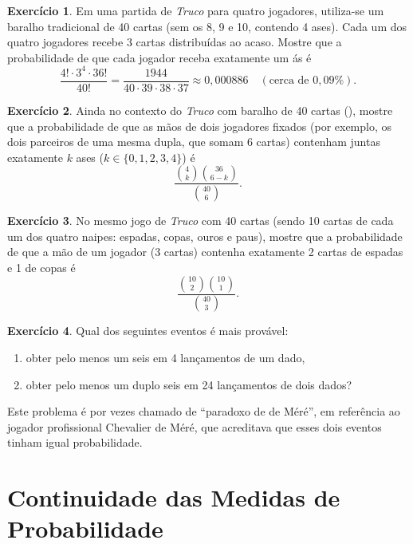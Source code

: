 \documentclass[12pt,portuguese]{article}
\theoremstyle{definition}
\newtheorem{exercise}{Exercício}
\begin{document}
\begin{exercise}\label{exercise:1.27}
Em uma partida de \emph{Truco} para quatro jogadores, utiliza-se um baralho
tradicional de 40 cartas (sem os 8, 9 e 10, contendo 4 ases). Cada um dos
quatro jogadores recebe 3 cartas distribuídas ao acaso. Mostre que a
probabilidade de que cada jogador receba exatamente um ás é
\[
\frac{4! \cdot 3^4 \cdot 36!}{40!}
= \frac{1944}{40 \cdot 39 \cdot 38 \cdot 37}
\approx 0{,}000886 \quad (\text{cerca de } 0{,}09\%).
\]
\end{exercise}

\begin{exercise}\label{exercise:1.28}
Ainda no contexto do \emph{Truco} com baralho de 40 cartas (),
mostre que a probabilidade de que as mãos de dois jogadores fixados (por exemplo,
os dois parceiros de uma mesma dupla, que somam 6 cartas) contenham juntas
exatamente \(k\) ases (\(k \in \{0, 1, 2, 3, 4\}\)) é
\[
\frac{\binom{4}{k} \binom{36}{6-k}}{\binom{40}{6}}.
\]
\end{exercise}

\begin{exercise}\label{exercise:1.29}
No mesmo jogo de \emph{Truco} com 40 cartas (sendo 10 cartas de cada um dos
quatro naipes: espadas, copas, ouros e paus), mostre que a probabilidade de
que a mão de um jogador (3 cartas) contenha exatamente 2 cartas de espadas e
1 de copas é
\[
\frac{\binom{10}{2} \binom{10}{1}}{\binom{40}{3}}.
\]
\end{exercise}

\begin{exercise}\label{exercise:1.30}
Qual dos seguintes eventos é mais provável:
\begin{enumerate}[label=(\alph*), ref=\alph*]
\item obter pelo menos um seis em 4 lançamentos de um dado,
\item obter pelo menos um duplo seis em 24 lançamentos de dois dados?
\end{enumerate}
Este problema é por vezes chamado de ``paradoxo de de M\'er\'e'', em referência
ao jogador profissional Chevalier de M\'er\'e, que acreditava que esses dois
eventos tinham igual probabilidade.
\end{exercise}

\section{Continuidade das Medidas de Probabilidade}
\end{document}
